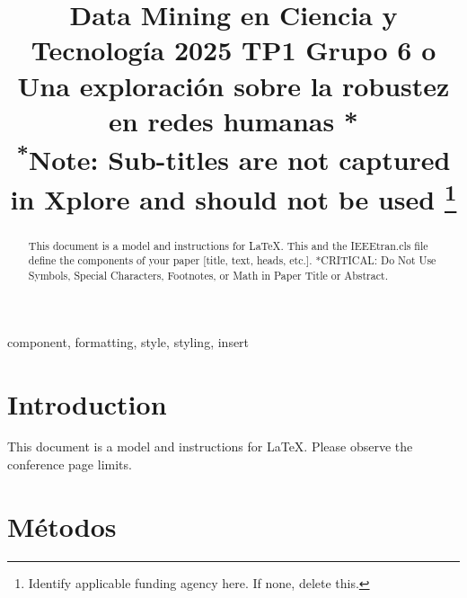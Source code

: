 \documentclass[conference]{IEEEtran}
\begin{document}
\title{Data Mining en Ciencia y Tecnología 2025 TP1 Grupo 6
 o Una exploración sobre la robustez en redes humanas *\\
{\footnotesize \textsuperscript{*}Note: Sub-titles are not captured in Xplore and
should not be used}
\thanks{Identify applicable funding agency here. If none, delete this.}
}

\author{
\and
{}
\and
{}
\and
{}
}

\maketitle
\thispagestyle{fancy}

\begin{abstract}
This document is a model and instructions for \LaTeX.
This and the IEEEtran.cls file define the components of your paper [title, text, heads, etc.]. *CRITICAL: Do Not Use Symbols, Special Characters, Footnotes, 
or Math in Paper Title or Abstract.
\end{abstract}

\begin{IEEEkeywords}
component, formatting, style, styling, insert
\end{IEEEkeywords}

\section{Introduction}
This document is a model and instructions for \LaTeX.
Please observe the conference page limits. 

\section{Métodos}
\end{document}
